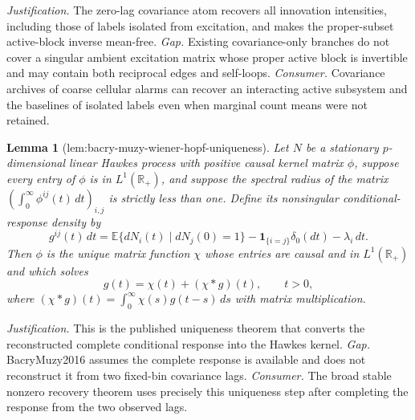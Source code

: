 \documentclass{article}
\newtheorem{lemma}{Lemma}
\begin{document}
\par\smallskip\noindent \textit{Justification.} The zero-lag covariance atom recovers all innovation intensities, including those of labels isolated from excitation, and makes the proper-subset active-block inverse mean-free. \textit{Gap.} Existing covariance-only branches do not cover a singular ambient excitation matrix whose proper active block is invertible and may contain both reciprocal edges and self-loops. \textit{Consumer.} Covariance archives of coarse cellular alarms can recover an interacting active subsystem and the baselines of isolated labels even when marginal count means were not retained.

\begin{lemma}[lem:bacry-muzy-wiener-hopf-uniqueness]\label{lem:bacry-muzy-wiener-hopf-uniqueness}
Let \(N\) be a stationary \(p\)-dimensional linear Hawkes process with positive causal kernel matrix \(\phi\), suppose every entry of \(\phi\) is in \(L^1(\mathbb R_+)\), and suppose the spectral radius of the matrix \((\int_0^\infty\phi^{ij}(t)\,dt)_{i,j}\) is strictly less than one.  Define its nonsingular conditional-response density by
\[
 g^{ij}(t)\,dt
 =\mathbb E\{dN_i(t)\mid dN_j(0)=1\}
  -\mathbf 1_{\{i=j\}}\delta_0(dt)-\lambda_i\,dt.
\]
Then \(\phi\) is the unique matrix function \(\chi\) whose entries are causal and in \(L^1(\mathbb R_+)\) and which solves
\[
 g(t)=\chi(t)+(\chi*g)(t),\qquad t>0,
\]
where \((\chi*g)(t)=\int_0^\infty\chi(s)g(t-s)\,ds\) with matrix multiplication.
\end{lemma}
\par\smallskip\noindent \textit{Justification.} This is the published uniqueness theorem that converts the reconstructed complete conditional response into the Hawkes kernel. \textit{Gap.} BacryMuzy2016 assumes the complete response is available and does not reconstruct it from two fixed-bin covariance lags. \textit{Consumer.} The broad stable nonzero recovery theorem uses precisely this uniqueness step after completing the response from the two observed lags.
\end{document}
